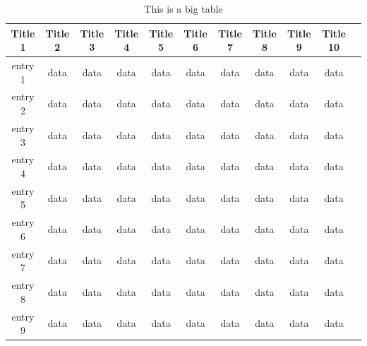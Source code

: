 \begin{table}[H]
\label{table:big_table}
\caption{This is a big table}
\centering
\begin{tabular}{ccccccccccc}
\toprule
\textbf{Title 1} & \textbf{Title 2}	& \textbf{Title 3} & \textbf{Title 4} & \textbf{Title 5}	& \textbf{Title 6} & \textbf{Title 7} & \textbf{Title 8} & \textbf{Title 9} & \textbf{Title 10}\\
\midrule
entry 1		& data & data & data & data & data & data & data & data & data \\
entry 2		& data & data & data & data & data & data & data & data & data \\
entry 3		& data & data & data & data & data & data & data & data & data \\
entry 4		& data & data & data & data & data & data & data & data & data \\
entry 5		& data & data & data & data & data & data & data & data & data \\
entry 6		& data & data & data & data & data & data & data & data & data \\
entry 7		& data & data & data & data & data & data & data & data & data \\
entry 8		& data & data & data & data & data & data & data & data & data \\
entry 9		& data & data & data & data & data & data & data & data & data \\
\bottomrule
\end{tabular}
\end{table}
